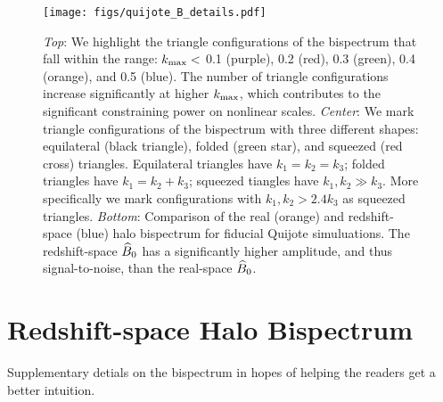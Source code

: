 \begin{figure}
\begin{center}
    \texttt{[image: figs/quijote\_B\_details.pdf]}
    \caption{
        {\em Top}: We highlight the triangle configurations of the bispectrum that fall within the range: 
        $k_{\rm max} <$ 0.1 (purple), 0.2 (red), 0.3 (green), 0.4 (orange), and 0.5 (blue). The number of 
        triangle configurations increase significantly at higher $k_{\rm max}$, which contributes to the 
        significant constraining power on nonlinear scales. 
        {\em Center}: We mark triangle configurations of the bispectrum with three different shapes:
        equilateral (black triangle), folded (green star), and squeezed (red cross) triangles. Equilateral 
        triangles have $k_1 = k_2 = k_3$; folded triangles have $k_1 = k_2 + k_3$; squeezed tiangles have 
        $k_1, k_2 \gg k_3$. More specifically we mark configurations with $k_1, k_2 > 2.4k_3$ as squeezed 
        triangles. 
        {\em Bottom}: Comparison of the real (orange) and redshift-space (blue) halo bispectrum for 
        fiducial Quijote simuluations. The redshift-space $\widehat{B}_0$ has a significantly higher 
        amplitude, and thus signal-to-noise, than the real-space $\widehat{B}_0$.
    } 
\label{fig:real_vs_rsd}
\end{center}
\end{figure}
\section{Redshift-space Halo Bispectrum} 
Supplementary detials on the bispectrum in hopes of helping the readers get a better intuition. 
